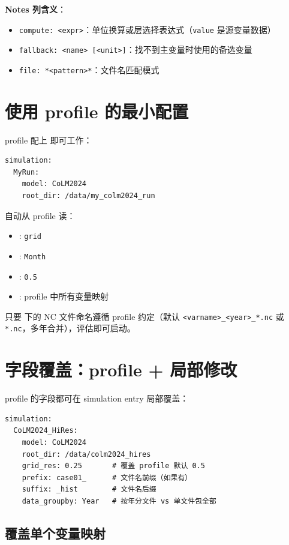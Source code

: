 \textbf{Notes 列含义}：

\begin{itemize}
  \item \texttt{compute: <expr>}：单位换算或层选择表达式（\texttt{value} 是源变量数据）
  \item \texttt{fallback: <name> [<unit>]}：找不到主变量时使用的备选变量
  \item \texttt{file: *<pattern>*}：文件名匹配模式
\end{itemize}

\section{使用 profile 的最小配置}

profile 配上  即可工作：

\begin{verbatim}
simulation:
  MyRun:
    model: CoLM2024
    root_dir: /data/my_colm2024_run
\end{verbatim}

\openbench{} 自动从 profile 读：
\begin{itemize}
  \item {}: \texttt{grid}
  \item {}: \texttt{Month}
  \item {}: \texttt{0.5}
  \item {}: profile 中所有变量映射
\end{itemize}

只要  下的 NC 文件命名遵循 profile 约定（默认 \texttt{<varname>\_<year>\_*.nc} 或 \texttt{*.nc}，多年合并），评估即可启动。

\section{字段覆盖：profile + 局部修改}

profile 的字段都可在 simulation entry 局部覆盖：

\begin{verbatim}
simulation:
  CoLM2024_HiRes:
    model: CoLM2024
    root_dir: /data/colm2024_hires
    grid_res: 0.25       # 覆盖 profile 默认 0.5
    prefix: case01_      # 文件名前缀（如果有）
    suffix: _hist        # 文件名后缀
    data_groupby: Year   # 按年分文件 vs 单文件包全部
\end{verbatim}

\subsection{覆盖单个变量映射}

